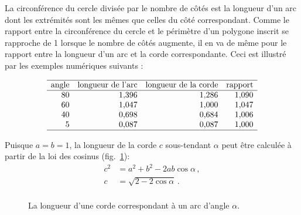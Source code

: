 La circonférence du cercle divisée par le nombre de côtés est la longueur d'un arc dont les extrémités sont les mêmes que celles du côté correspondant. Comme le rapport entre la circonférence du cercle et le périmètre d'un polygone inscrit se rapproche de 1 lorsque le nombre de côtés augmente, il en va de même pour le rapport entre la longueur d'un arc et la corde correspondante. Ceci est illustré par les exemples numériques suivants :

\enlargethispage{\baselineskip}
\vspace{-1ex}

\[
\begin{array}{r@{\hspace{10pt}}r@{\hspace{10pt}}r@{\hspace{10pt}}r}
\hline
\textrm{angle} & \textrm{longueur de l'arc} & \textrm{longueur de la corde} & \textrm{rapport}\\
\hline
80 & \mbox{1,396} & \mbox{1,286}  & \mbox{1,090}\\
60 & \mbox{1,047} & \mbox{1,000}  & \mbox{1,047}\\
40 & \mbox{0,698} & \mbox{0,684} & \mbox{1,006}\\
5  & \mbox{0,087} & \mbox{0,087} &\mbox{1,000} \\\hline
\end{array}
\]

Puisque $a=b=1$, la longueur de la corde $c$ sous-tendant $\alpha$ peut être calculée à partir de la loi des cosinus 
 (fig.~\ref{fig.length-of-a-chord}):
\begin{align*}
c^2&=a^2+b^2-2ab\cos \alpha\,,\\
c&=\sqrt{2-2\cos \alpha}\,.\\
\end{align*}


\begin{figure}[htbp]
\centering

\caption{La longueur d'une corde correspondant à un arc d'angle $\alpha$.}\label{fig.length-of-a-chord}
\end{figure}


